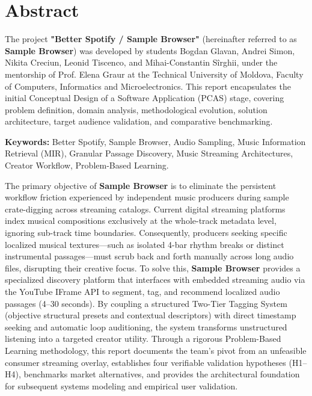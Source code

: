 \chapter*{Abstract}

The project \textbf{"Better Spotify / Sample Browser"} (hereinafter referred to as \textbf{Sample Browser}) was developed by students Bogdan Glavan, Andrei Simon, Nikita Creciun, Leonid Tiscenco, and Mihai-Constantin S\^{i}rghii, under the mentorship of Prof. Elena Graur at the Technical University of Moldova, Faculty of Computers, Informatics and Microelectronics. This report encapsulates the initial Conceptual Design of a Software Application (PCAS) stage, covering problem definition, domain analysis, methodological evolution, solution architecture, target audience validation, and comparative benchmarking.

\textbf{Keywords: } Better Spotify, Sample Browser, Audio Sampling, Music Information Retrieval (MIR), Granular Passage Discovery, Music Streaming Architectures, Creator Workflow, Problem-Based Learning.

The primary objective of \textbf{Sample Browser} is to eliminate the persistent workflow friction experienced by independent music producers during sample crate-digging across streaming catalogs. Current digital streaming platforms index musical compositions exclusively at the whole-track metadata level, ignoring sub-track time boundaries. Consequently, producers seeking specific localized musical textures---such as isolated 4-bar rhythm breaks or distinct instrumental passages---must scrub back and forth manually across long audio files, disrupting their creative focus. To solve this, \textbf{Sample Browser} provides a specialized discovery platform that interfaces with embedded streaming audio via the YouTube IFrame API to segment, tag, and recommend localized audio passages (4--30 seconds). By coupling a structured Two-Tier Tagging System (objective structural presets and contextual descriptors) with direct timestamp seeking and automatic loop auditioning, the system transforms unstructured listening into a targeted creator utility. Through a rigorous Problem-Based Learning methodology, this report documents the team's pivot from an unfeasible consumer streaming overlay, establishes four verifiable validation hypotheses (H1--H4), benchmarks market alternatives, and provides the architectural foundation for subsequent systems modeling and empirical user validation.
